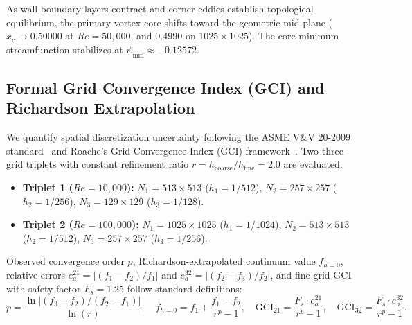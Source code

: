 \documentclass[11pt,a4paper]{article}
\begin{document}
As wall boundary layers contract and corner eddies establish topological equilibrium, the primary vortex core shifts toward the geometric mid-plane ($x_c \to 0.50000$ at $Re = 50{,}000$, and $0.4990$ on $1025 \times 1025$). The core minimum streamfunction stabilizes at $\psi_{\min} \approx -0.12572$.

\subsection{Formal Grid Convergence Index (GCI) and Richardson Extrapolation}
We quantify spatial discretization uncertainty following the ASME V\&V 20-2009 standard~\cite{asme2009standard} and Roache's Grid Convergence Index (GCI) framework~\cite{roache1994perspective,roache1997quantification,roache1998verification}. Two three-grid triplets with constant refinement ratio $r = h_{\text{coarse}} / h_{\text{fine}} = 2.0$ are evaluated:
\begin{itemize}
    \item \textbf{Triplet 1 ($Re = 10,000$):} $N_1 = 513 \times 513$ ($h_1 = 1/512$), $N_2 = 257 \times 257$ ($h_2 = 1/256$), $N_3 = 129 \times 129$ ($h_3 = 1/128$).
    \item \textbf{Triplet 2 ($Re = 100,000$):} $N_1 = 1025 \times 1025$ ($h_1 = 1/1024$), $N_2 = 513 \times 513$ ($h_2 = 1/512$), $N_3 = 257 \times 257$ ($h_3 = 1/256$).
\end{itemize}

Observed convergence order $p$, Richardson-extrapolated continuum value $f_{h=0}$, relative errors $e_a^{21} = |(f_1 - f_2)/f_1|$ and $e_a^{32} = |(f_2 - f_3)/f_2|$, and fine-grid GCI with safety factor $F_s = 1.25$ follow standard definitions:
\begin{equation}
    p = \frac{\ln |(f_3 - f_2) / (f_2 - f_1)|}{\ln(r)}, \quad f_{h=0} = f_1 + \frac{f_1 - f_2}{r^p - 1}, \quad \text{GCI}_{21} = \frac{F_s \cdot e_a^{21}}{r^p - 1}, \quad \text{GCI}_{32} = \frac{F_s \cdot e_a^{32}}{r^p - 1}.
\end{equation}
\end{document}
